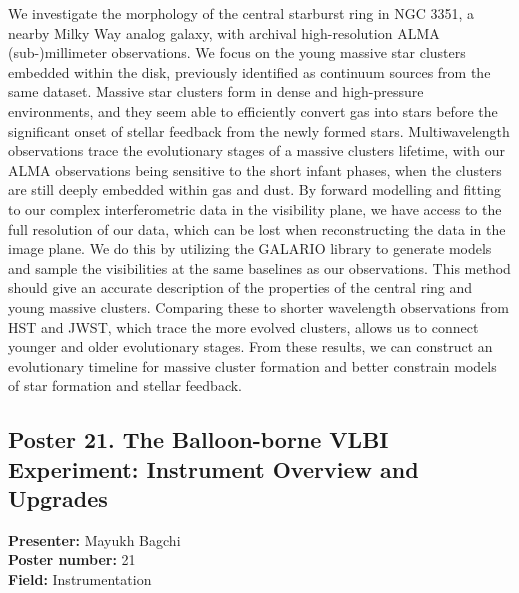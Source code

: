We investigate the morphology of the central starburst ring in NGC 3351, a nearby Milky Way analog galaxy, with archival high-resolution ALMA (sub-)millimeter observations. We focus on the young massive star clusters embedded within the disk, previously identified as continuum sources from the same dataset. Massive star clusters form in dense and high-pressure environments, and they seem able to efficiently convert gas into stars before the significant onset of stellar feedback from the newly formed stars. Multiwavelength observations trace the evolutionary stages of a massive clusters lifetime, with our ALMA observations being sensitive to the short infant phases, when the clusters are still deeply embedded within gas and dust. By forward modelling and fitting to our complex interferometric data in the visibility plane, we have access to the full resolution of our data, which can be lost when reconstructing the data in the image plane. We do this by utilizing the GALARIO library to generate models and sample the visibilities at the same baselines as our observations. This method should give an accurate description of the properties of the central ring and young massive clusters. Comparing these to shorter wavelength observations from HST and JWST, which trace the more evolved clusters, allows us to connect younger and older evolutionary stages. From these results, we can construct an evolutionary timeline for massive cluster formation and better constrain models of star formation and stellar feedback.

\hypertarget{poster-abstract-talk-63}{}\label{poster-abstract-page-talk-63}
\subsection*{Poster 21. The Balloon-borne VLBI Experiment: Instrument Overview and Upgrades}
\textbf{Presenter:} Mayukh Bagchi\\
\textbf{Poster number:} 21\\
\textbf{Field:} Instrumentation


